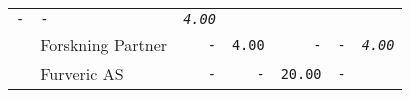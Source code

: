 \documentclass[11pt,A4paper,]{article}
\begin{document}
\begin{longtable}[]{@{}llrrrrr@{}}
\begin{minipage}[t]{0.14\columnwidth}
\texttt{-}\strut
\end{minipage} & \begin{minipage}[t]{0.14\columnwidth}\raggedleft\strut
\texttt{-}\strut
\end{minipage} & \begin{minipage}[t]{0.14\columnwidth}\raggedleft\strut
\emph{\texttt{4.00}}\strut
\end{minipage}\tabularnewline
\begin{minipage}[t]{0.14\columnwidth}\raggedright\strut
\strut
\end{minipage} & \begin{minipage}[t]{0.14\columnwidth}\raggedright\strut
Forskning Partner\strut
\end{minipage} & \begin{minipage}[t]{0.14\columnwidth}\raggedleft\strut
\texttt{-}\strut
\end{minipage} & \begin{minipage}[t]{0.14\columnwidth}\raggedleft\strut
\texttt{4.00}\strut
\end{minipage} & \begin{minipage}[t]{0.14\columnwidth}\raggedleft\strut
\texttt{-}\strut
\end{minipage} & \begin{minipage}[t]{0.14\columnwidth}\raggedleft\strut
\texttt{-}\strut
\end{minipage} & \begin{minipage}[t]{0.14\columnwidth}\raggedleft\strut
\emph{\texttt{4.00}}\strut
\end{minipage}\tabularnewline
\begin{minipage}[t]{0.14\columnwidth}\raggedright\strut
\strut
\end{minipage} & \begin{minipage}[t]{0.14\columnwidth}\raggedright\strut
Furveric AS\strut
\end{minipage} & \begin{minipage}[t]{0.14\columnwidth}\raggedleft\strut
\texttt{-}\strut
\end{minipage} & \begin{minipage}[t]{0.14\columnwidth}\raggedleft\strut
\texttt{-}\strut
\end{minipage} & \begin{minipage}[t]{0.14\columnwidth}\raggedleft\strut
\texttt{20.00}\strut
\end{minipage} & \begin{minipage}[t]{0.14\columnwidth}\raggedleft\strut
\texttt{-}\strut
\end{minipage} & \begin{minipage}[t]{0.14\columnwidth}\raggedleft\strut

\end{minipage}
\end{longtable}
\end{document}

